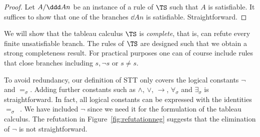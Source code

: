 \begin{proof}
  Let $A/\ddd A n$ be an instance of a rule of $\TS$
  such that $A$ is satisfiable.  It suffices to show
  that one of the branches $\dd A n$ is satisfiable.
  Straightforward.
\end{proof}

We will show that the tableau calculus $\TS$ is
\emph{complete}, that is, can refute every finite
unsatisfiable branch.  The rules of $\TS$ are designed
such that we obtain a strong completeness result.
For practical purposes one can of course include rules 
that close branches including $s,\neg s$
or $s\neq s$.

To avoid redundancy, our definition of STT only covers the logical
constants $\neg$ and $=_\sigma$.
Adding further constants such as $\land$, $\lor$, $\to$,
$\forall_{\!\sigma}$ and $\exists_\sigma$ is straightforward.
In fact, all logical constants can be expressed with the identities
$=_\sigma$~\cite{AndrewsBook}.  We have included $\neg$ since we need
it for the formulation of the tableau calculus.  The refutation
in Figure~\ref{fig:refutationneg}
suggests that the elimination of $\neg$ is not straightforward.


